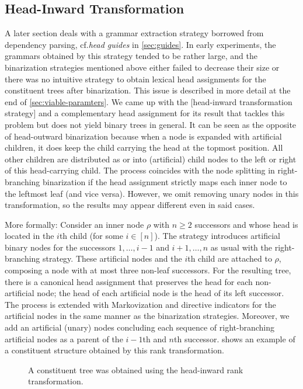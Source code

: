 \documentclass[../../document.tex]{subfiles}
\begin{document}
    \subsection{Head-Inward Transformation} \label{sec:extraction:bin:hi}
    A later section deals with a grammar extraction strategy borrowed from dependency parsing, cf.\@ \emph{head guides} in \cref{sec:guides}.
    In early experiments, the grammars obtained by this strategy tended to be rather large, and the binarization strategies mentioned above either failed to decrease their size or there was no intuitive strategy to obtain lexical head assignments for the constituent trees after binarization.
    This issue is described in more detail at the end of \cref{sec:viable-paramters}.
    We came up with the [head-inward transformation strategy] and a complementary head assignment for its result that tackles this problem but does not yield binary trees in general.
    It can be seen as the opposite of head-outward binarization because when a node is expanded with artificial children, it does keep the child carrying the head at the topmost position.
    All other children are distributed as or into (artificial) child nodes to the left or right of this head-carrying child.
    The process coincides with the node splitting in right-branching binarization if the head assignment strictly maps each inner node to the leftmost leaf (and vice versa).
    However, we omit removing unary nodes in this transformation, so the results may appear different even in said cases.

    More formally:  
        Consider an inner node \(\rho\) with \(n \geq 2\) successors and whose head is located in the \(i\)th child (for some \(i \in [n]\)).
        The strategy introduces artificial binary nodes for the successors \(1, \ldots, i-1\) and \(i+1, \ldots, n\) as usual with the right-branching strategy.
    These artificial nodes and the \(i\)th child are attached to \(\rho\), composing a node with at most three non-leaf successors.
    For the resulting tree, there is a canonical head assignment that preserves the head for each non-artificial node; the head of each artificial node is the head of its left successor.
    The process is extended with Markovization and directive indicators for the artificial nodes in the same manner as the binarization strategies.
    Moreover, we add an artificial (unary) nodes concluding each sequence of right-branching artificial nodes as a parent of the \(i-1\)th and \(n\)th successor.
     shows an example of a constituent structure obtained by this rank transformation.

    \begin{figure}
        \centering
        
        \caption{\label{fig:ex:head-inward}
            A constituent tree was obtained using the head-inward rank transformation.
        }
    \end{figure}


    \ifSubfilesClassLoaded{%
        \printindex
    }{}
\end{document}

